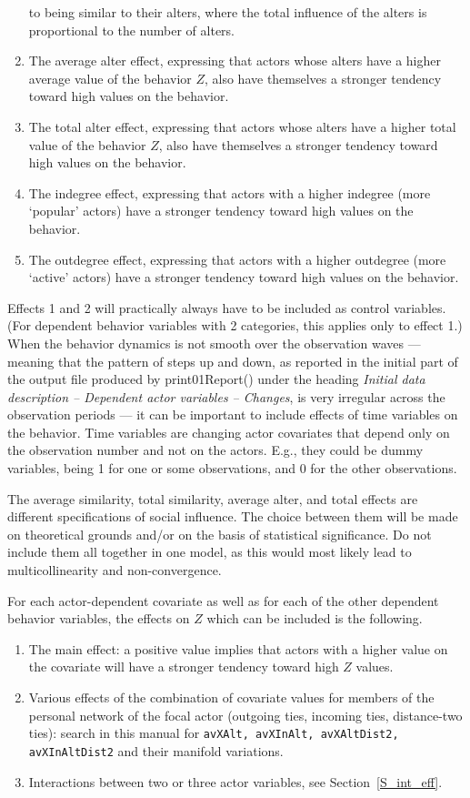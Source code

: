 \documentclass[a4paper,fleqn,11pt]{article}
\newcommand{\+}{\, + \,}
\newcommand{\sfn}[1]{\textsf{#1}}
\begin{document}
\begin{enumerate}
      to being similar to their alters,
      where the total influence of the alters is proportional to
      the number of alters.
\item The average alter effect, expressing that actors
      whose alters have a higher average value of the behavior $Z$,
      also have themselves a stronger tendency toward high values on the behavior.
\item The total alter effect, expressing that actors
      whose alters have a higher total value of the behavior $Z$,
      also have themselves a stronger tendency toward high values on the behavior.
\item The indegree effect, expressing that actors with a higher indegree
      (more `popular' actors) have a stronger tendency toward high values on the behavior.
\item The outdegree effect, expressing that actors with a higher outdegree
      (more `active' actors) have a stronger tendency toward high values on the behavior.
\end{enumerate}
Effects 1 and 2 will practically always have to be included as control variables.
(For dependent behavior variables with 2 categories, this applies only to effect 1.)
When the behavior dynamics is not smooth over the observation waves --- meaning that
the pattern of steps up and down, as reported in the initial part of the
output file produced by \sfn{print01Report()}
under the heading \emph{Initial data description -- Dependent actor variables -- Changes},
is very irregular across the observation periods --- it can be important to include
effects of time variables on the behavior.
Time variables are changing actor covariates that depend only on the
observation number and not on the actors. E.g., they could be dummy variables, being 1
for one or some observations, and 0 for the other observations.

The average similarity, total similarity, average alter, and total effects
are different specifications of social influence.
The choice between them will be made on theoretical grounds
and/or on the basis of statistical significance.
Do not include them all together in one model, as this would most likely
lead to multicollinearity and non-convergence.
\medskip

For each actor-dependent covariate as well as for each of the other
dependent behavior variables,
the effects on $Z$ which can be included is the following.
\begin{enumerate}
\item The main effect: a positive value implies that actors with a
      higher value on the covariate will have a stronger tendency
      toward high $Z$ values.
\item Various effects of the combination of covariate values for members
      of the personal network of the focal actor (outgoing ties, incoming
      ties, distance-two ties): search in this manual for \texttt{avXAlt,
      avXInAlt, avXAltDist2, avXInAltDist2} and their manifold variations.
\item Interactions between two or three actor variables, see
      Section~\ref{S_int_eff}.
\end{enumerate}
\end{document}
